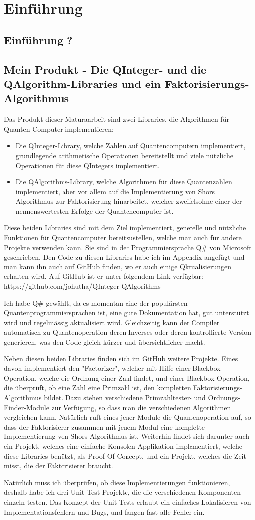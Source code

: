 \chapter{Einführung}
\section{Einführung ?}
\section{Mein Produkt - Die QInteger- und die QAlgorithm-Libraries und ein Faktorisierungs-Algorithmus}
Das Produkt dieser Maturaarbeit sind zwei Libraries, die Algorithmen für Quanten-Computer implementieren: 
\begin{itemize}
    \item Die QInteger-Library, welche Zahlen auf Quantencomputern implementiert, grundlegende arithmetische Operationen bereitstellt und viele nützliche Operationen für diese QIntegers implementiert.
    \item Die QAlgorithms-Library, welche Algorithmen für diese Quantenzahlen implementiert, aber vor allem auf die Implementierung von Shors Algorithmus zur Faktorisierung hinarbeitet, welcher zweifelsohne einer der nennenswertesten Erfolge der Quantencomputer ist.
\end{itemize}
Diese beiden Libraries sind mit dem Ziel implementiert, generelle und nützliche Funktionen für Quantencomputer bereitzustellen, welche man auch für andere Projekte verwenden kann. Sie sind in der Programmiersprache Q\# von Microsoft geschrieben. Den Code zu diesen Libraries habe ich im Appendix angefügt und man kann ihn auch auf GitHub finden, wo er auch einige Qktualisierungen erhalten wird. Auf GitHub ist er unter folgendem Link verfügbar: https://github.com/johutha/QInteger-QAlgorithms

Ich habe Q\# gewählt, da es momentan eine der populärsten Quantenprogrammiersprachen ist, eine gute Dokumentation hat, gut unterstützt wird und regelmässig aktualisiert wird. Gleichzeitig kann der Compiler automatisch zu Quantenoperation deren Inverses oder deren kontrollierte Version generieren, was den Code gleich kürzer und übersichtlicher macht. 

Neben diesen beiden Libraries finden sich im GitHub weitere Projekte. Eines davon implementiert den "Factorizer", welcher mit Hilfe einer Blackbox-Operation, welche die Ordnung einer Zahl findet, und einer Blackbox-Operation, die überprüft, ob eine Zahl eine Primzahl ist, den kompletten Faktorisierungs-Algorithmus bildet. Dazu stehen verschiedene Primzahltester- und Ordnungs-Finder-Module zur Verfügung, so dass man die verschiedenen Algorithmen vergleichen kann. Natürlich ruft eines jener Module die Quantenoperation auf, so dass der Faktorisierer zusammen mit jenem Modul eine komplette Implementierung von Shors Algorithmus ist. Weiterhin findet sich darunter auch ein Projekt, welches eine einfache Konsolen-Applikation implementiert, welche diese Libraries benützt, als Proof-Of-Concept, und ein Projekt, welches die Zeit misst, die der Faktorisierer braucht.

Natürlich muss ich überprüfen, ob diese Implementierungen funktionieren, deshalb habe ich drei Unit-Test-Projekte, die die verschiedenen Komponenten einzeln testen. Das Konzept der Unit-Tests erlaubt ein einfaches Lokalisieren von Implementationsfehlern und Bugs, und fangen fast alle Fehler ein.